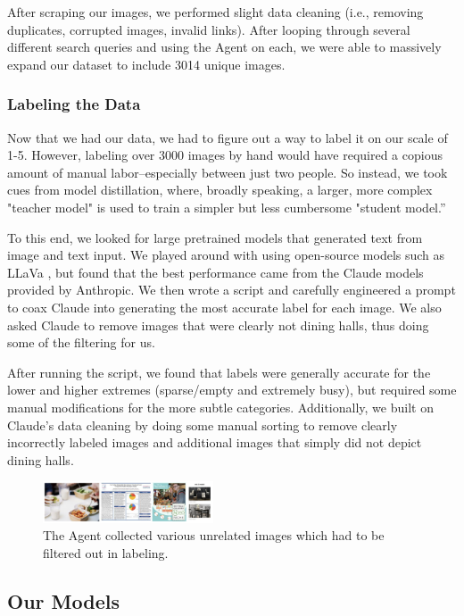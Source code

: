 \documentclass{article}
\begin{document}
\begin{multicols}{2}
After scraping our images, we performed slight data cleaning (i.e., removing duplicates, corrupted images, invalid links). After looping through several different search queries and using the Agent on each, we were able to massively expand our dataset to include 3014 unique images.

\subsubsection*{Labeling the Data}
Now that we had our data, we had to figure out a way to label it on our scale of 1-5. However, labeling over 3000 images by hand would have required a copious amount of manual labor–especially between just two people. So instead, we took cues from model distillation, where, broadly speaking, a larger, more complex "teacher model" is used to train a simpler but less cumbersome "student model.”

To this end, we looked for large pretrained models that generated text from image and text input. We played around with using open-source models such as LLaVa \cite{liuVisualInstructionTuning2023}, but found that the best performance came from the Claude models provided by Anthropic. We then wrote a script and carefully engineered a prompt to coax Claude into generating the most accurate label for each image. We also asked Claude to remove images that were clearly not dining halls, thus doing some of the filtering for us.

After running the script, we found that labels were generally accurate for the lower and higher extremes (sparse/empty and extremely busy), but required some manual modifications for the more subtle categories. Additionally, we built on Claude’s data cleaning by doing some manual sorting to remove clearly incorrectly labeled images and additional images that simply did not depict dining halls.

\begin{figure}[H]
  \centering
  \includegraphics[width=0.45\textwidth]{badScrapedImages.png}
  \caption{The Agent collected various unrelated images which had to be filtered out in labeling.}
  \label{fig:fig3}
\end{figure}

\subsection*{Our Models}


\end{multicols}
\end{document}
